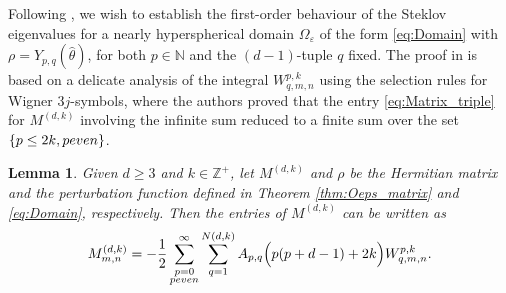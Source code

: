 \documentclass[11pt]{amsart}
\theoremstyle{definition}
\theoremstyle{plain}
\newtheorem{lemma}[definition]{Lemma}
\theoremstyle{remark}
\newcommand{\Z}{\mathbb{Z}}
\newcommand{\N}{\mathbb{N}}
\newcommand{\vareps}{\varepsilon}
\newcommand{\tn}{\textnormal}
\begin{document}
Following \cite[Corollary 2.3]{viator2022}, we wish to establish the first-order behaviour of the Steklov eigenvalues for a nearly hyperspherical domain $\Omega_\vareps$ of the form \eqref{eq:Domain} with $\rho = Y_{p, q}(\hat\theta)$, for both $p\in\N$ and the $(d - 1)$-tuple $q$ fixed. The proof in \cite{viator2022} is based on a delicate analysis of the integral $W^{p, k}_{q, m, n}$ using the selection rules for Wigner $3j$-symbols, where the authors proved that the entry \eqref{eq:Matrix_triple} for $M^{(d, k)}$ involving the infinite sum reduced to a finite sum over the set $\{p\le 2k, p\tn{ even}\}$. 


\begin{lemma} \label{thm:Matrix_triple_finite} 
Given $d\ge 3$ and $k\in\Z^+$, let $M^{(d, k)}$ and $\rho$ be the Hermitian matrix and the perturbation function defined in Theorem \ref{thm:Oeps_matrix} and \eqref{eq:Domain}, respectively. Then the entries of $M^{(d, k)}$ can be written as 
\begin{equation} 
M_{m ,n}^{(d, k)} = -\frac{1}{2}\sum_{\substack{p = 0 \\ p \tn{ even}}}^\infty\sum_{q = 1}^{N(d, k)} A_{p, q}\Big(p(p + d - 1) + 2k\Big)W_{q, m, n}^{p, k}. 
\end{equation} 
\end{lemma} 
\end{document}
